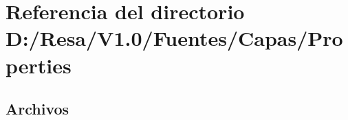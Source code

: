 \section{Referencia del directorio D\+:/\+Resa/\+V1.0/\+Fuentes/\+Capas/\+Properties}
\label{dir_bc408bded5fa3bac82da6ae67893e667}
\subsection*{Archivos}
\begin{DoxyCompactItemize}
\end{DoxyCompactItemize}
